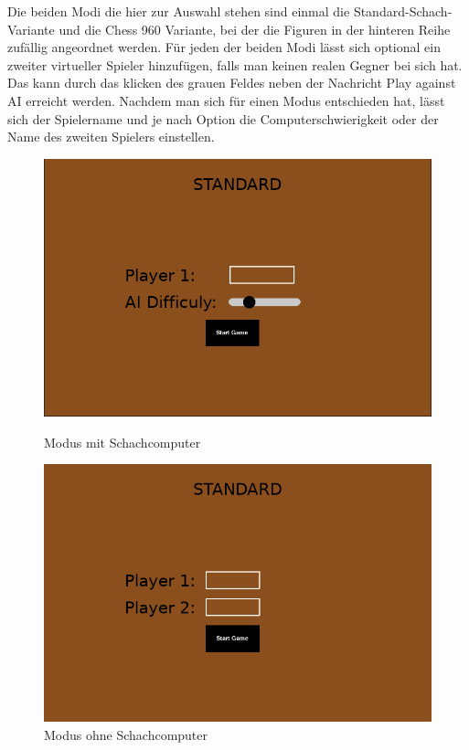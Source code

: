 \documentclass[a4paper, 10pt]{scrartcl}
\begin{document}
Die beiden Modi die hier zur Auswahl stehen sind einmal die Standard-Schach-Variante und die Chess 960 Variante,
bei der die Figuren in der hinteren Reihe zufällig angeordnet werden.
Für jeden der beiden Modi lässt sich optional ein zweiter virtueller Spieler hinzufügen, falls man keinen realen Gegner bei sich hat.
Das kann durch das klicken des grauen Feldes neben der Nachricht \glqq{}Play against AI \grqq erreicht werden.
Nachdem man sich für einen Modus entschieden hat, lässt sich der Spielername und je nach Option die Computerschwierigkeit oder der Name des zweiten Spielers einstellen.
\begin{figure}[h]
        \begin{minipage}[b]{.45\linewidth} %
           \includegraphics[width=\linewidth]{assets/login_w_bot.PNG}
           \caption{Modus mit Schachcomputer}
        \end{minipage}
        \hspace{.1\linewidth}%
        \begin{minipage}[b]{.45\linewidth} %
           \includegraphics[width=\linewidth]{assets/login_wo_bot.PNG}
           \caption{Modus ohne Schachcomputer}
        \end{minipage}
\end{figure}
\end{document}
